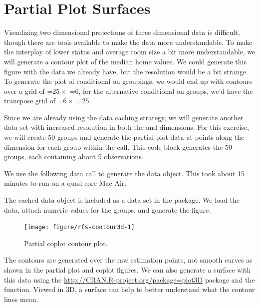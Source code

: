 \documentclass[nojss]{jss}\usepackage[]{graphicx}\usepackage[]{color}
\begin{document}
\section{Partial Plot Surfaces}

Visualizing two dimensional projections of three dimensional data is difficult, though there are tools available to make the data more understandable. To make the interplay of lower status and average room size a bit more understandable, we will generate a contour plot of the median home values. We could generate this figure with the data we already have, but the resolution would be a bit strange. To generate the plot of  conditional on  groupings, we would end up with contours over a grid of =$25 \times$ =$6$, for the alternative  conditional on  groups, we'd have the transpose grid of =$6 \times$  =$25$. 

Since we are already using the data caching strategy, we will generate another  data set with increased resolution in both the  and  dimensions. For this exercise, we will create 50  groups and generate the partial plot data at  points along the  dimension for each group within the  call. This code block generates the 50  groups, each containing about 9 observations.     



We use the following data call to generate the  data object. This took about 15 minutes to run on a quad core Mac Air.



The cached  data object is included as a data set in the  package. We load the data, attach numeric values for the  groups, and generate the figure.

\begin{Schunk}
\begin{figure}[!htpb]

{\centering \texttt{[image: figure/rfs-contour3d-1]} 

}

\caption[Partial coplot contour plot]{Partial coplot contour plot.\label{fig:contour3d}}
\end{figure}
\end{Schunk}

The contours are generated over the raw  estimation points, not smooth curves as shown in the partial plot and coplot figures. We can also generate a surface with this data using the  \url{http://CRAN.R-project.org/package=plot3D} package and the  function. Viewed in 3D, a surface can help to better understand what the contour lines mean. 
\end{document}

